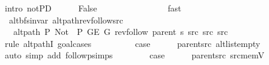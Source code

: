\begin{isabellebody}
\ {\isacharparenleft}{\kern0pt}intro\ not{\isacharunderscore}{\kern0pt}P{\isacharprime}{\kern0pt}D{\isacharparenleft}{\kern0pt}{}{\isacharparenright}{\kern0pt}{\isacharparenright}{\kern0pt}\isanewline
\ \ \ \ \isamarkupfalse%
\ False\isanewline
\ \ \ \ \ \ \isamarkupfalse%
\ {}\isanewline
\ \ \ \ \ \ \isamarkupfalse%
\ fast\isanewline
\ \ \isamarkupfalse%
\isanewline
{}\isamarkupfalse%
%
\endisatagproof
{\isafoldproof}%
%
\isadelimproof
\isanewline
%
\endisadelimproof
\isanewline
{}\isamarkupfalse%
\ {\isacharparenleft}{\kern0pt}\ alt{\isacharunderscore}{\kern0pt}bfs{\isacharunderscore}{\kern0pt}invar{\isacharparenright}{\kern0pt}\ alt{\isacharunderscore}{\kern0pt}path{\isacharunderscore}{\kern0pt}rev{\isacharunderscore}{\kern0pt}follow{\isacharunderscore}{\kern0pt}src{\isacharcolon}{\kern0pt}\isanewline
\ \ \ {\isachardoublequoteopen}alt{\isacharunderscore}{\kern0pt}path\ P{\isacharprime}{\kern0pt}{\isacharprime}{\kern0pt}\ {\isacharparenleft}{\kern0pt}Not\ {\isasymcirc}\ P{\isacharprime}{\kern0pt}{\isacharprime}{\kern0pt}{\isacharparenright}{\kern0pt}\ {\isacharparenleft}{\kern0pt}G{\isachardot}{\kern0pt}E\ G{\isacharparenright}{\kern0pt}\ {\isacharparenleft}{\kern0pt}rev{\isacharunderscore}{\kern0pt}follow\ {\isacharparenleft}{\kern0pt}parent\ s{\isacharparenright}{\kern0pt}\ src{\isacharparenright}{\kern0pt}\ src\ src{\isachardoublequoteclose}\isanewline
%
\isadelimproof
%
\endisadelimproof
%
\isatagproof
{}\isamarkupfalse%
\ {\isacharparenleft}{\kern0pt}rule\ alt{\isacharunderscore}{\kern0pt}pathI{\isacharcomma}{\kern0pt}\ goal{\isacharunderscore}{\kern0pt}cases{\isacharparenright}{\kern0pt}\isanewline
\ \ \isamarkupfalse%
\ {}\isanewline
\ \ \isamarkupfalse%
\ \isamarkupfalse%
\ {\isacharquery}{\kern0pt}case\isanewline
\ \ \ \ \isamarkupfalse%
\ parent{\isacharunderscore}{\kern0pt}src\ alt{\isacharunderscore}{\kern0pt}list{\isacharunderscore}{\kern0pt}empty\isanewline
\ \ \ \ \isamarkupfalse%
\ {\isacharparenleft}{\kern0pt}auto\ simp\ add{\isacharcolon}{\kern0pt}\ follow{\isacharunderscore}{\kern0pt}psimps{\isacharparenright}{\kern0pt}\isanewline
{}\isamarkupfalse%
\isanewline
\ \ \isamarkupfalse%
\ {}\isanewline
\ \ \isamarkupfalse%
\ {\isacharquery}{\kern0pt}case\isanewline
\ \ \ \ \isamarkupfalse%
\ parent{\isacharunderscore}{\kern0pt}src\ src{\isacharunderscore}{\kern0pt}mem{\isacharunderscore}{\kern0pt}V\isanewline

\end{isabellebody}
